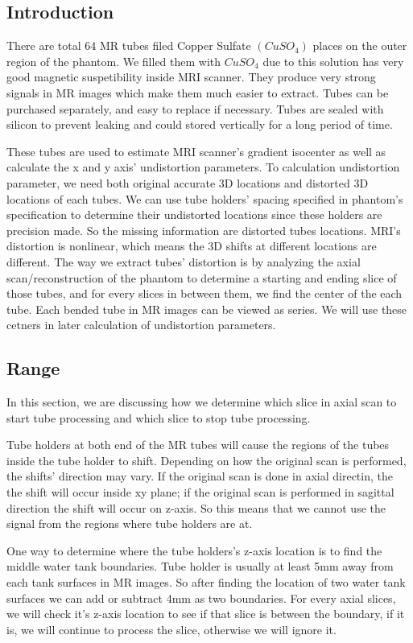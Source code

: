 \subsection{Introduction}
There are total 64 MR tubes filed Copper Sulfate $(CuSO_4)$ places on the outer region of the phantom.
We filled them with $CuSO_4$ due to this solution has very good magnetic suspetibility inside MRI scanner. 
They produce very strong signals in MR images which make them much easier to extract. Tubes can be purchased
separately, and easy to replace if necessary. Tubes are sealed with silicon to prevent leaking and could stored
vertically for a long period of time. 

These tubes are used to estimate MRI scanner's gradient isocenter as well as calculate the x and y axis' 
undistortion parameters. To calculation undistortion parameter, we need both original accurate 3D locations
and distorted 3D locations of each tubes. We can use tube holders' spacing specified in phantom's 
specification to determine their undistorted locations since these holders are precision made. So the missing
information are distorted tubes locations. MRI's distortion is nonlinear, which means the 3D shifts at
different locations are different. The way we extract tubes' distortion is by analyzing the axial 
scan/reconstruction of the phantom to determine a starting and ending slice of those tubes, and for every
slices in between them, we find the center of the each tube. Each bended tube in MR images can be viewed as
series. We will use these cetners in later calculation of undistortion parameters.

\subsection{Range}
In this section, we are discussing how we determine which slice in axial scan to start tube processing and 
which slice to stop tube processing.

Tube holders at both end of the MR tubes will cause the regions of the tubes inside the tube holder to shift. 
Depending on how the original scan is performed, the shifts' direction may vary. If the original scan is
done in axial directin, the the shift will occur inside xy plane; if the original scan is performed in
sagittal direction the shift will occur on z-axis. So this means that we cannot use the signal from the 
regions where tube holders are at. 

One way to determine where the tube holders's z-axis location is to find the middle water tank boundaries. 
Tube holder is usually at least 5mm away from each  tank surfaces in MR images. So after finding the location
of two water tank surfaces we can add or subtract 4mm as two boundaries. For every axial slices, we will
check it's z-axis location to see if that slice is between the boundary, if it is, we will continue to process
the slice, otherwise we will ignore it.

